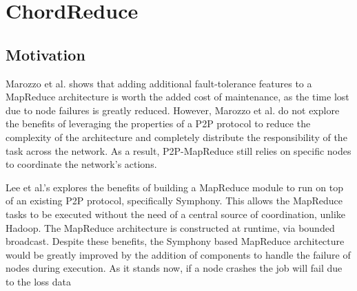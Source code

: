 \documentclass[conference, compsocconf, letterpaper]{IEEEtran}
\begin{document}




\section{ChordReduce}


\subsection{Motivation}



Marozzo et al. \cite{marozzo2012p2p} shows that adding additional fault-tolerance features to a MapReduce architecture is worth the added cost of maintenance, as the time lost due to node failures is greatly reduced.  However, Marozzo et al. do not explore the benefits of leveraging the properties of a P2P protocol to reduce the complexity of the architecture and completely distribute the responsibility of the task across the network.  As a result, P2P-MapReduce still relies on specific nodes to coordinate the network's actions.

Lee et al.'s \cite{leemap} explores the benefits of building a MapReduce module to run on top of an existing P2P protocol, specifically Symphony.  This allows the MapReduce tasks to be executed without the need of a central source of coordination, unlike Hadoop.  The MapReduce architecture is constructed at runtime, via bounded broadcast. Despite these benefits, the Symphony based MapReduce architecture would be greatly improved by the addition of components to handle the failure of nodes during execution.  As it stands now, if a node crashes the job will fail due to the loss data
\end{document}
